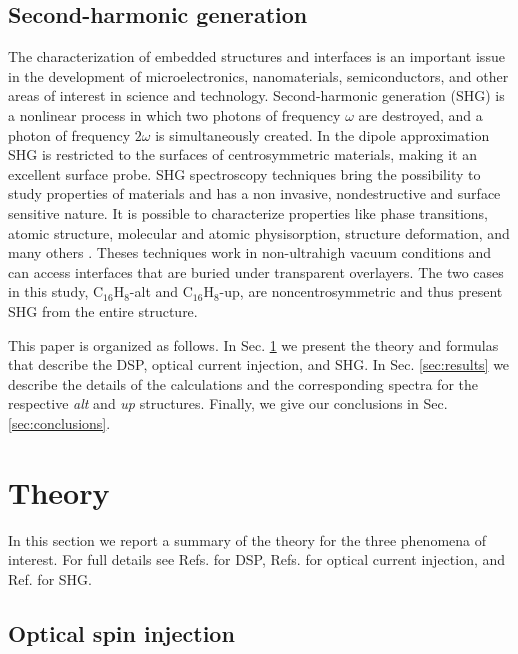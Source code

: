 \documentclass[pss]{wiley2sp} %
\begin{document}
\subsection{Second-harmonic generation}

The characterization of embedded structures and interfaces is an important
issue in the development of microelectronics, nanomaterials, semiconductors,
and other areas of interest in science and technology. Second-harmonic
generation (SHG) is a nonlinear process in which two photons of frequency
$\omega$ are destroyed, and a photon of frequency $2\omega$ is simultaneously
created. In the dipole approximation SHG is restricted to the surfaces of
centrosymmetric materials, making it an excellent surface probe. SHG
spectroscopy techniques bring the possibility to study properties of materials
and has a non invasive, nondestructive and surface sensitive nature. It is
possible to characterize properties like phase transitions, atomic structure,
molecular and atomic physisorption, structure deformation, and many others
\cite{dadapPRB97,godefroyAPL96,salazarPRB14,mendozaPRL98}. Theses techniques
work in non-ultrahigh vacuum conditions and can access interfaces that are
buried under transparent overlayers. The two cases in this study,
C$_{16}$H$_{8}$-alt and C$_{16}$H$_{8}$-up, are noncentrosymmetric and thus
present SHG from the entire structure.

This paper is organized as follows. In Sec. \ref{sec:theory} we present the
theory and formulas that describe the DSP, optical current injection, and SHG.
In Sec. \ref{sec:results} we describe the details of the calculations and the
corresponding spectra for the respective \emph{alt} and \emph{up} structures.
Finally, we give our conclusions in Sec. \ref{sec:conclusions}.


\section{Theory}\label{sec:theory}

In this section we report a summary of the theory for the three phenomena of
interest. For full details see Refs. \cite{nastosPRB07,mendozaPRB12} for DSP,
Refs. \cite{cabellosPRB11,sipePRB00} for optical current injection, and Ref.
\cite{andersonPRB15} for SHG.


\subsection{Optical spin injection}\label{sec:theory-DSP}
\end{document}
